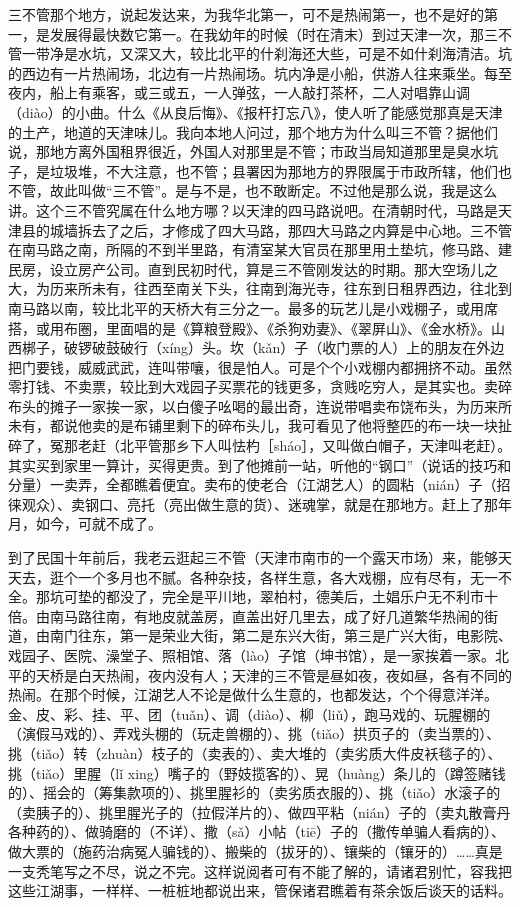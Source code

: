 \documentclass[12pt,UTF8]{ctexbook}
\begin{document}
三不管那个地方，说起发达来，为我华北第一，可不是热闹第一，也不是好的第一，是发展得最快数它第一。在我幼年的时候（时在清末）到过天津一次，那三不管一带净是水坑，又深又大，较比北平的什刹海还大些，可是不如什刹海清洁。坑的西边有一片热闹场，北边有一片热闹场。坑内净是小船，供游人往来乘坐。每至夜内，船上有乘客，或三或五，一人弹弦，一人敲打茶杯，二人对唱靠山调（diào）的小曲。什么《从良后悔》、《报杆打忘八》，使人听了能感觉那真是天津的土产，地道的天津味儿。我向本地人问过，那个地方为什么叫三不管？据他们说，那地方离外国租界很近，外国人对那里是不管；市政当局知道那里是臭水坑子，是垃圾堆，不大注意，也不管；县署因为那地方的界限属于市政所辖，他们也不管，故此叫做“三不管”。是与不是，也不敢断定。不过他是那么说，我是这么讲。这个三不管究属在什么地方哪？以天津的四马路说吧。在清朝时代，马路是天津县的城墙拆去了之后，才修成了四大马路，那四大马路之内算是中心地。三不管在南马路之南，所隔的不到半里路，有清室某大官员在那里用土垫坑，修马路、建民房，设立房产公司。直到民初时代，算是三不管刚发达的时期。那大空场儿之大，为历来所未有，往西至南关下头，往南到海光寺，往东到日租界西边，往北到南马路以南，较比北平的天桥大有三分之一。最多的玩艺儿是小戏棚子，或用席搭，或用布圈，里面唱的是《算粮登殿》、《杀狗劝妻》、《翠屏山》、《金水桥》。山西梆子，破锣破鼓破行（xíng）头。坎（kǎn）子（收门票的人）上的朋友在外边把门要钱，威威武武，连叫带嚷，很是怕人。可是个个小戏棚内都拥挤不动。虽然零打钱、不卖票，较比到大戏园子买票花的钱更多，贪贱吃穷人，是其实也。卖碎布头的摊子一家挨一家，以白傻子吆喝的最出奇，连说带唱卖布饶布头，为历来所未有，都说他卖的是布铺里剩下的碎布头儿，我可看见了他将整匹的布一块一块扯碎了，冤那老赶（北平管那乡下人叫怯杓［sháo］，又叫做白帽子，天津叫老赶）。其实买到家里一算计，买得更贵。到了他摊前一站，听他的“钢口”（说话的技巧和分量）一卖弄，全都瞧着便宜。卖布的使老合（江湖艺人）的圆粘（nián）子（招徕观众）、卖钢口、亮托（亮出做生意的货）、迷魂掌，就是在那地方。赶上了那年月，如今，可就不成了。

到了民国十年前后，我老云逛起三不管（天津市南市的一个露天市场）来，能够天天去，逛个一个多月也不腻。各种杂技，各样生意，各大戏棚，应有尽有，无一不全。那坑可垫的都没了，完全是平川地，翠柏村，德美后，土娼乐户无不利市十倍。由南马路往南，有地皮就盖房，直盖出好几里去，成了好几道繁华热闹的街道，由南门往东，第一是荣业大街，第二是东兴大街，第三是广兴大街，电影院、戏园子、医院、澡堂子、照相馆、落（lào）子馆（坤书馆），是一家挨着一家。北平的天桥是白天热闹，夜内没有人；天津的三不管是昼如夜，夜如昼，各有不同的热闹。在那个时候，江湖艺人不论是做什么生意的，也都发达，个个得意洋洋。金、皮、彩、挂、平、团（tuǎn）、调（diào）、柳（liǔ），跑马戏的、玩腥棚的（演假马戏的）、弄戏头棚的（玩走兽棚的）、挑（tiǎo）拱页子的（卖当票的）、挑（tiǎo）转（zhuàn）枝子的（卖表的）、卖大堆的（卖劣质大件皮袄毯子的）、挑（tiǎo）里腥（lǐ xing）嘴子的（野妓揽客的）、晃（huàng）条儿的（蹲签赌钱的）、摇会的（筹集款项的）、挑里腥衫的（卖劣质衣服的）、挑（tiǎo）水滚子的（卖胰子的）、挑里腥光子的（拉假洋片的）、做四平粘（nián）子的（卖丸散膏丹各种药的）、做骑磨的（不详）、撒（sǎ）小帖（tiē）子的（撒传单骗人看病的）、做大票的（施药治病冤人骗钱的）、搬柴的（拔牙的）、镶柴的（镶牙的）……真是一支秃笔写之不尽，说之不完。这样说阅者可有不能了解的，请诸君别忙，容我把这些江湖事，一样样、一桩桩地都说出来，管保诸君瞧着有茶余饭后谈天的话料。
\end{document}
